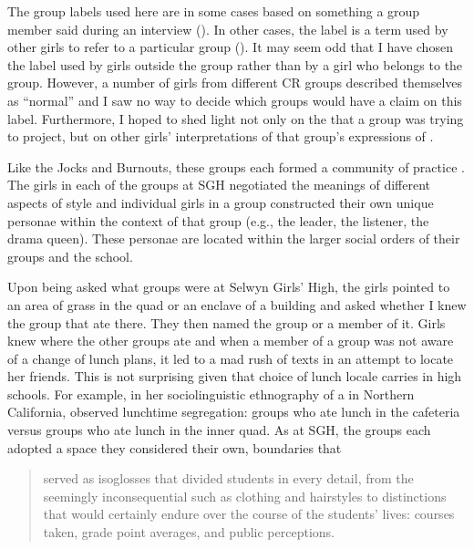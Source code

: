 The group labels used here are in some cases based on something a group member said during an interview (). In other cases, the label is a term used by other girls to refer to a particular group (). It may seem odd that I have chosen the label used by girls outside the group rather than by a girl who belongs to the group. However, a number of girls from different CR groups described themselves as ``normal'' and I saw no way to decide which groups would have a claim on this label. Furthermore, I hoped to shed light not only on the  that a group was trying to project, but on other girls' interpretations of that group's expressions of . 



Like the Jocks and Burnouts, these groups each formed a community of practice \citep{eckert2005}. The girls in each of the groups at SGH negotiated the meanings of different aspects of style and individual girls in a group constructed their own unique personae within the context of that group (e.g., the leader, the listener, the drama queen). These personae are located within the larger social orders of their groups and the school.

Upon being asked what groups were at Selwyn Girls' High, the girls pointed to an area of grass in the quad or an enclave of a building and asked whether I knew the group that ate there. They then named the group or a member of it. Girls knew where the other groups ate and when a member of a group was not aware of a change of lunch plans, it led to a mad rush of texts in an attempt to locate her friends. This is not surprising given that choice of lunch locale carries  in high schools. For example, in her sociolinguistic ethnography of a  in Northern California, \citet{mendozadenton2008} observed lunchtime segregation: groups who ate lunch in the cafeteria versus groups who ate lunch in the inner quad. As at SGH, the groups each adopted a space they considered their own, boundaries that

\begin{quote}
	served as isoglosses that divided students in every detail, from the seemingly inconsequential such as clothing and hairstyles to distinctions that would certainly endure over the course of the students' lives: courses taken, grade point averages, and public perceptions. \citep[27]{mendozadenton2008}
\end{quote}
  
